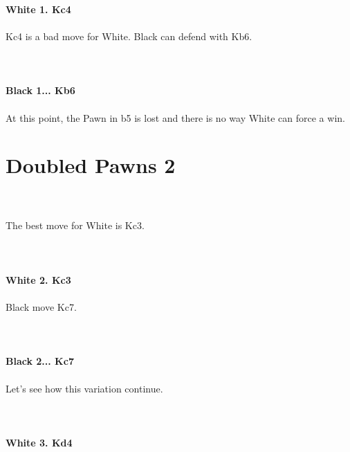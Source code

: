 \documentclass{article}
\begin{document}
\\

\\
\\
\textbf{White 1. Kc4}\\
\\
Kc4 is a bad move for White. Black can defend with Kb6.\\
\\

\\
\\
\textbf{Black 1... Kb6}\\
\\
At this point, the Pawn in b5 is lost and there is no way White can force a win.\section{ Doubled Pawns 2}

\\
\\
The best move for White is Kc3.\\
\\

\\
\\
\textbf{White 2. Kc3}\\
\\
Black move Kc7.\\
\\

\\
\\
\textbf{Black 2... Kc7}\\
\\
Let's see how this variation continue.\\
\\

\\
\\
\textbf{White 3. Kd4}\\
\\
\\
\\

\\
\end{document}
